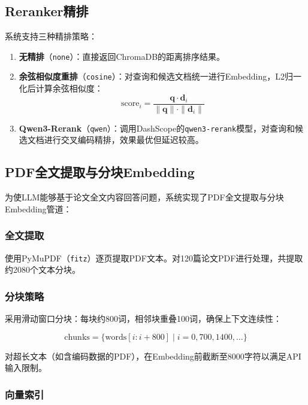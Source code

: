 \documentclass[12pt,a4paper]{ctexart}
\newcommand{\code}[1]{\texttt{#1}}
\begin{document}
\subsection{Reranker精排}

系统支持三种精排策略：

\begin{enumerate}
\item \textbf{无精排}（\code{none}）：直接返回ChromaDB的距离排序结果。
\item \textbf{余弦相似度重排}（\code{cosine}）：对查询和候选文档统一进行Embedding，L2归一化后计算余弦相似度：
\begin{equation}
\text{score}_i = \frac{\mathbf{q} \cdot \mathbf{d}_i}{\|\mathbf{q}\| \cdot \|\mathbf{d}_i\|}
\end{equation}
\item \textbf{Qwen3-Rerank}（\code{qwen}）：调用DashScope的\code{qwen3-rerank}模型，对查询和候选文档进行交叉编码精排，效果最优但延迟较高。
\end{enumerate}

\subsection{PDF全文提取与分块Embedding}

为使LLM能够基于论文全文内容回答问题，系统实现了PDF全文提取与分块Embedding管道：

\subsubsection{全文提取}

使用PyMuPDF（\code{fitz}）逐页提取PDF文本。对120篇论文PDF进行处理，共提取约2080个文本分块。

\subsubsection{分块策略}

采用滑动窗口分块：每块约800词，相邻块重叠100词，确保上下文连续性：

\begin{equation}
\text{chunks} = \{\text{words}[i:i+800] \mid i = 0, 700, 1400, \dots\}
\end{equation}

对超长文本（如含编码数据的PDF），在Embedding前截断至8000字符以满足API输入限制。

\subsubsection{向量索引}
\end{document}
